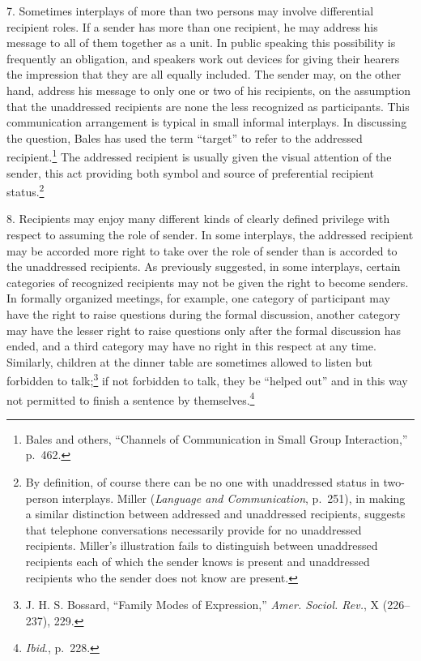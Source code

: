 \documentclass[twoside,symmetric,nobib,justified]{tufte-book}
\begin{document}
7. Sometimes interplays of more than two persons may involve
differential recipient roles. If a sender has more than one recipient,
he may address his message to all of them together as a unit. In public
speaking this possibility is frequently an obligation, and speakers work
out devices for giving their hearers the impression that they are all
equally included. The sender may, on the other hand, address his message
to only one or two of his recipients, on the assumption that the
unaddressed recipients are none the less recognized as participants.
This communication arrangement is typical in small informal interplays.
In discussing the question, Bales has used the term ``target'' to refer
to the addressed recipient.\footnote{Bales and others, ``Channels of
  Communication in Small Group Interaction,'' p.~462.} The addressed
recipient is usually given the visual attention of the sender, this act
providing both symbol and source of preferential recipient
status.\footnote{By definition, of course there can be no one with
  unaddressed status in two-person interplays. Miller (\emph{Language
  and Communication}, p.~251), in making a similar distinction between
  addressed and unaddressed recipients, suggests that telephone
  conversations necessarily provide for no unaddressed recipients.
  Miller's illustration fails to distinguish between unaddressed
  recipients each of which the sender knows is present and unaddressed
  recipients who the sender does not know are present.}

8. Recipients may enjoy many different kinds of clearly defined
privilege with respect to assuming the role of sender. In some
interplays, the addressed recipient may be accorded more right to take
over the role of sender than is accorded to the unaddressed recipients.
As previously suggested, in some interplays, certain categories of
recognized recipients may not be given the right to become senders. In
formally organized meetings, for example, one category of participant
may have the right to raise questions during the formal discussion,
another category may have the lesser right to raise questions only after
the formal discussion has ended, and a third category may have no right
in this respect at any time. Similarly, children at the dinner table are
sometimes allowed to listen but forbidden to talk;\footnote{J. H. S.
  Bossard, ``Family Modes of Expression,'' \emph{Amer. Sociol. Rev.}, X
  (226--237), 229.} if not forbidden to talk, they be ``helped out'' and
in this way not permitted to finish a sentence by themselves.\footnote{\emph{Ibid}.,
  p.~228.}
\end{document}
